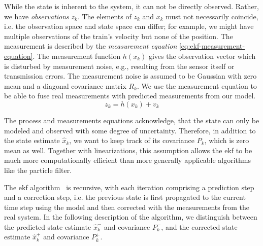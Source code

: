 While the state is inherent to the system, it can not be directly observed. Rather, we have \textit{observations} $z_k$. The elements of $z_k$ and $x_k$ must not necessarily coincide, i.e. the observation space and state space can differ; for example, we might have multiple observations of the train's velocity but none of the position. The measurement is described by the \textit{measurement equation} \ref{eq:ekf-measurement-equation}. The measurement function $h(x_k)$ gives the observation vector which is disturbed by measurement noise, e.g., resulting from the sensor itself or transmission errors. The measurement noise is assumed to be Gaussian with zero mean and a diagonal covariance matrix $R_k$. We use the measurement equation to be able to fuse real measurements with predicted measurements from our model.
\begin{equation}\label{eq:ekf-measurement-equation}%
z_k = h(x_k) + v_k%
\end{equation}

The process and measurements equations acknowledge, that the state can only be modeled and observed with some degree of uncertainty. Therefore, in addition to the state estimate $\hat{x}_k$, we want to keep track of its covariance $P_k$, which is zero mean as well. Together with linearizations, this assumption allows the \gls{ekf} to be much more computationally efficient than more generally applicable algorithms like the particle filter.

The \gls{ekf} algorithm~\cite[p.~16~ff.]{Haykin.2001} is recursive, with each iteration comprising a prediction step and a correction step, i.e. the previous state is first propagated to the current time step using the model and then corrected with the measurements from the real system. In the following description of the algorithm, we distinguish between the predicted state estimate $\hat{x}_k^-$ and covariance $P_k^-$, and the corrected state estimate $\hat{x}_k^+$ and covariance $P_k^+$.

